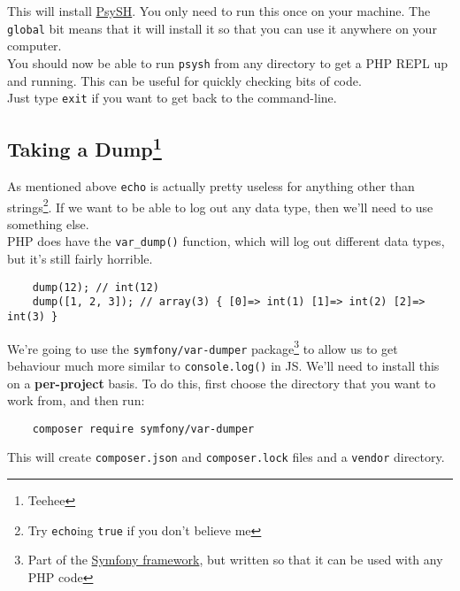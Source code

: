 This will install \href{https://psysh.org/}{PsySH}. You only need to run this once on your machine. The \texttt{global} bit means that it will install it so that you can use it anywhere on your computer.
\\

You should now be able to run \texttt{psysh} from any directory to get a PHP REPL up and running. This can be useful for quickly checking bits of code.
\\

Just type \texttt{exit} if you want to get back to the command-line.

\subsection[Taking a Dump]{Taking a Dump\footnote{Teehee}}

As mentioned above \texttt{echo} is actually pretty useless for anything other than strings\footnote{Try \texttt{echo}ing \texttt{true} if you don't believe me}. If we want to be able to log out any data type, then we'll need to use something else.
\\

PHP does have the \texttt{var\_dump()} function, which will log out different data types, but it's still fairly horrible.

\begin{verbatim}
    dump(12); // int(12)
    dump([1, 2, 3]); // array(3) { [0]=> int(1) [1]=> int(2) [2]=> int(3) }
\end{verbatim}

We're going to use the \texttt{symfony/var-dumper} package\footnote{Part of the \href{https://symfony.com/}{Symfony framework}, but written so that it can be used with any PHP code} to allow us to get behaviour much more similar to \texttt{console.log()} in JS. We'll need to install this on a \textbf{per-project} basis. To do this, first choose the directory that you want to work from, and then run:

\begin{verbatim}
    composer require symfony/var-dumper
\end{verbatim}

This will create \texttt{composer.json} and \texttt{composer.lock} files and a \texttt{vendor} directory.

